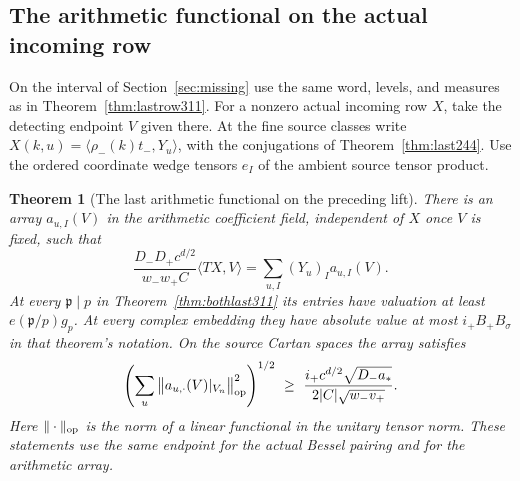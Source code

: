 \documentclass[a4paper,11pt]{article}
\newtheorem{theorem}[proposition]{Theorem}
\theoremstyle{definition}
\theoremstyle{remark}
\numberwithin{equation}{section}
\begin{document}
\subsection{The arithmetic functional on the actual incoming row}\label{nav:I-76}
On the interval of Section~\ref{sec:missing} use the same word,
levels, and measures as in Theorem~\ref{thm:lastrow311}.
For a nonzero actual incoming row \(X\), take the detecting
endpoint \(V\) given there. At the fine source classes write
\(X(k,u)=\langle\rho_-(k)t_-,Y_u\rangle\), with the conjugations
of Theorem~\ref{thm:last244}. Use the ordered coordinate wedge
tensors \(e_I\) of the ambient source tensor product.

\begin{theorem}[The last arithmetic functional on the preceding lift]\leavevmode
\label{thm:pullback311}
There is an array \(a_{u,I}(V)\) in the arithmetic coefficient
field, independent of \(X\) once \(V\) is fixed, such that
\[
 \frac{D_-D_+c^{d/2}}{w_-w_+ C}\langle TX,V\rangle
                  =\sum_{u,I}(Y_u)_I a_{u,I}(V).
\]
At every \(\mathfrak p\mid p\) in Theorem~\ref{thm:bothlast311}
its entries have valuation at least \(e(\mathfrak p/p)g_p\).
At every complex embedding they have absolute value at most
\(i_+ B_+B_\sigma\) in that theorem's notation. On the source
Cartan spaces the array satisfies
\[
 \left(\sum_u
   \big\|a_{u,\cdot}(V)|_{V_n}\big\|_{\rm op}^2\right)^{1/2}
 \ \ge\ \frac{i_+c^{d/2}\sqrt{D_-a_*}}
                 {2|C|\sqrt{w_-v_+}} .
\]
Here \(\|\cdot\|_{\rm op}\) is the norm of a linear functional
in the unitary tensor norm. These statements use the same
endpoint for the actual Bessel pairing and for the arithmetic
array.
\end{theorem}
\end{document}
